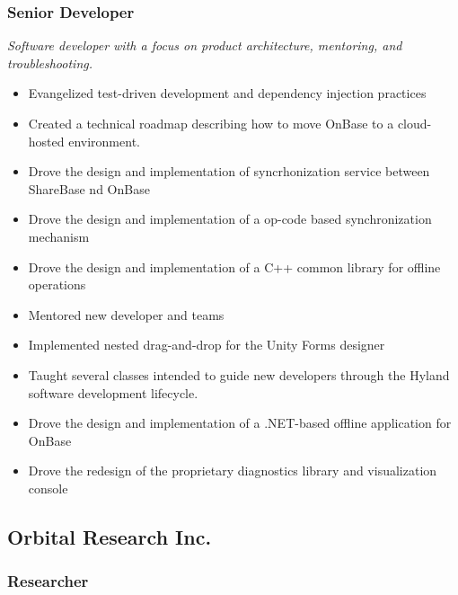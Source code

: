 \documentclass{cv_style}
\begin{document}
			\subsubsection*{Senior Developer}
			\textit{Software developer with a focus on product architecture, mentoring, and troubleshooting.}
			\begin{itemize}
				\item Evangelized test-driven development and dependency injection practices
				\item Created a technical roadmap describing how to move OnBase to a cloud-hosted environment.
				\item Drove the design and implementation of syncrhonization service between ShareBase nd OnBase
				\item Drove the design and implementation of a op-code based synchronization mechanism
				\item Drove the design and implementation of a C++ common library for offline operations
				\item Mentored new developer and teams
				\item Implemented nested drag-and-drop for the Unity Forms designer
				\item Taught several classes intended to guide new developers through the Hyland software development lifecycle.
				\item Drove the design and implementation of a .NET-based offline application for OnBase
				\item Drove the redesign of the proprietary diagnostics library and visualization console
			\end{itemize}

		\subsection{Orbital Research Inc.}
			\subsubsection*{Researcher}

\end{document}
